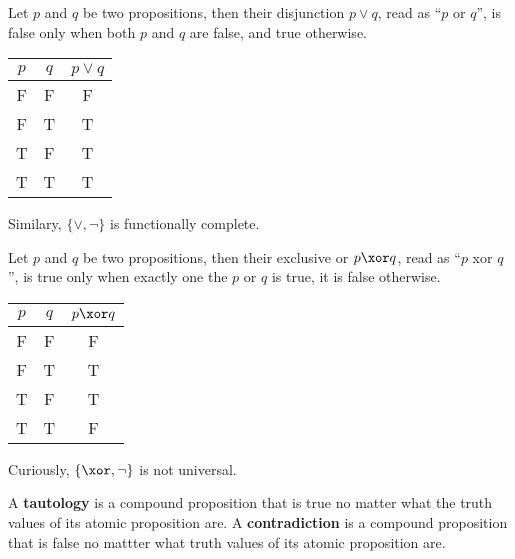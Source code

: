 \begin{definition}[Disjunction]
    Let \(p\) and \(q\) be two propositions, then their disjunction \(p \lor q\), read as ``\(p\) or \(q\)'', is false only when both \(p\) and \(q\) are false, and true otherwise.
    \begin{center}
        \begin{tabular}[c]{c  c | c}
            \(p\) & \(q\) & \(p \lor q\) \\ \hline
            F     & F     & F            \\
            F     & T     & T            \\
            T     & F     & T            \\
            T     & T     & T            \\
        \end{tabular}
    \end{center}
\end{definition}

Similary, \(\{\lor, \neg\}\) is functionally complete.

\begin{definition}[Exclusive or]
    Let \(p\) and \(q\) be two propositions, then their exclusive or \(p \xor q\), read as ``\(p\) xor \(q\)'', is true only when exactly one the \(p\) or \(q\) is true, it is false otherwise.
    \begin{center}
        \begin{tabular}[c]{c  c | c}
            \(p\) & \(q\) & \(p \xor q\) \\ \hline
            F     & F     & F            \\
            F     & T     & T            \\
            T     & F     & T            \\
            T     & T     & F            \\
        \end{tabular}
    \end{center}
\end{definition}

Curiously, \(\{\xor, \neg\}\) is not universal.

\begin{definition}
    A \textbf{tautology} is a compound proposition that is true no matter what the truth values of its atomic proposition are. A \textbf{contradiction} is a compound proposition that is false no mattter what truth values of its atomic proposition are.
\end{definition}


